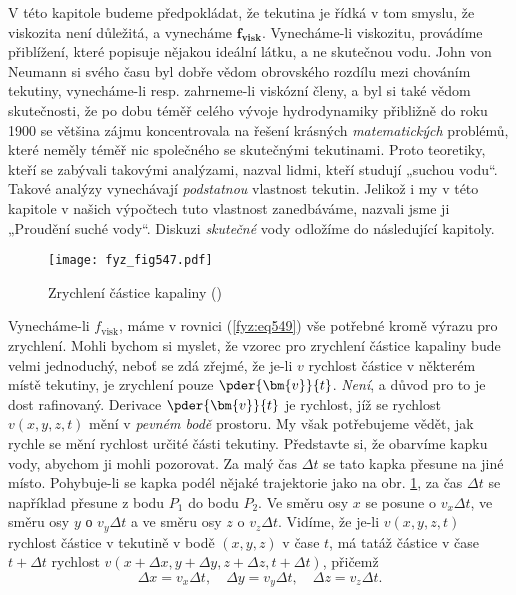     V této kapitole budeme předpokládat, že tekutina je řídká v tom smyslu, že viskozita není 
    důležitá, a vynecháme \(\bm{f_{\text{visk}}}\). Vynecháme-li viskozitu, provádíme 
    přiblížení, které popisuje nějakou ideální látku, a ne skutečnou vodu. John von Neumann si 
    svého času byl dobře vědom obrovského rozdílu mezi chováním tekutiny, vynecháme-li resp. 
    zahrneme-li viskózní členy, a byl si také vědom skutečnosti, že po dobu téměř celého vývoje 
    hydrodynamiky přibližně do roku \num{1900} se většina zájmu koncentrovala na řešení krásných 
    \emph{matematických} problémů, které neměly téměř nic společného se skutečnými tekutinami. 
    Proto teoretiky, kteří se zabývali takovými analýzami, nazval lidmi, kteří studují „suchou 
    vodu“. Takové analýzy vynechávají \emph{podstatnou} vlastnost tekutin. Jelikož i my v této 
    kapitole v našich výpočtech tuto vlastnost zanedbáváme, nazvali jsme ji „Proudění suché vody“. 
    Diskuzi \emph{skutečné} vody odložíme do následující kapitoly.
    
    \begin{figure}[ht!] %
      \centering
      \texttt{[image: fyz\_fig547.pdf]}
      \caption{Zrychlení částice kapaliny
               (\cite[s.~744]{Feynman02})}
      \label{fyz:fig547}
    \end{figure}
    
    Vynecháme-li \(f_{\text{visk}}\), máme v rovnici (\ref{fyz:eq549}) vše potřebné kromě výrazu 
    pro zrychlení. Mohli bychom si myslet, že vzorec pro zrychlení částice kapaliny bude velmi 
    jednoduchý, neboť se zdá zřejmé, že je-li \(v\) rychlost částice v některém místě tekutiny, je 
    zrychlení pouze \(\pder{\bm{v}}{t}\). \emph{Není}, a důvod pro to je dost rafinovaný. Derivace 
    \(\pder{\bm{v}}{t}\) je rychlost, jíž se rychlost \(v(x, y, z, t)\) mění v \emph{pevném bodě} 
    prostoru. My však potřebujeme vědět, jak rychle se mění rychlost určité části tekutiny. 
    Představte si, že obarvíme kapku vody, abychom ji mohli pozorovat. Za malý čas \(\Delta t\) se 
    tato kapka přesune na jiné místo. Pohybuje-li se kapka podél nějaké trajektorie jako na obr. 
    \ref{fyz:fig547}, za čas \(\Delta t\) se například přesune z bodu \(P_1\) do bodu \(P_2\). Ve 
    směru osy \(x\) se posune o \(v_x\Delta t\), ve směru osy \(y\) о \(v_y\Delta t\) a ve směru 
    osy \(z\) o \(v_z\Delta t\). Vidíme, že je-li \(v(x, y, z, t)\) rychlost částice v tekutině v 
    bodě \((x, y, z)\) v čase \(t\), má tatáž částice v čase \(t + \Delta t\) rychlost \(v(x+ 
    \Delta x, y + \Delta y, z + \Delta z, t + \Delta t)\), přičemž
    \begin{equation*}
      \Delta x = v_x\Delta t, \quad  \Delta y = v_y\Delta t, \quad  \Delta z = v_z\Delta t.
    \end{equation*}
    
